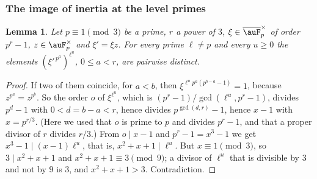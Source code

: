 \documentclass[10pt]{amsart}
\newtheorem{lemma}[theorem]{Lemma}
\theoremstyle{definition}
\theoremstyle{remark}
\begin{document}
\subsubsection*{The image of inertia at the level primes}

\begin{lemma}\label{pg:cyclic}
Let $p\equiv1\pmod3$ be a prime, $r$ a power of $3$, $\xi\in\overline{\auF}_p^\times$ of order
$p^r-1$, $z\in\auF_p^\times$ and $\xi'=\xi z$. For every prime $\ell\ne p$ and every $u\ge0$ the
elements $(\xi'^{\,p^a})^{\ell^u}$, $0\le a<r$, are pairwise distinct.
\end{lemma}
\begin{proof}
If two of them coincide, for $a<b$, then $\xi^{\ell^up^a(p^{b-a}-1)}=1$, because
$z^{p^a}=z^{p^b}$. So the order $o$ of $\xi^{\ell^u}$, which is $(p^r-1)/\gcd(\ell^u,p^r-1)$,
divides $p^d-1$ with $0<d=b-a<r$, hence divides $p^{\gcd(d,r)}-1$, hence $x-1$ with $x=p^{r/3}$.
(Here we used that $o$ is prime to $p$ and divides $p^r-1$, and that a proper divisor of $r$ divides
$r/3$.) From $o\mid x-1$ and $p^r-1=x^3-1$ we get $x^3-1\mid(x-1)\ell^u$, that is,
$x^2+x+1\mid\ell^u$. But $x\equiv1\pmod3$, so $3\mid x^2+x+1$ and $x^2+x+1\equiv3\pmod9$; a divisor
of $\ell^u$ that is divisible by $3$ and not by $9$ is $3$, and $x^2+x+1>3$. Contradiction.
\end{proof}
\end{document}
